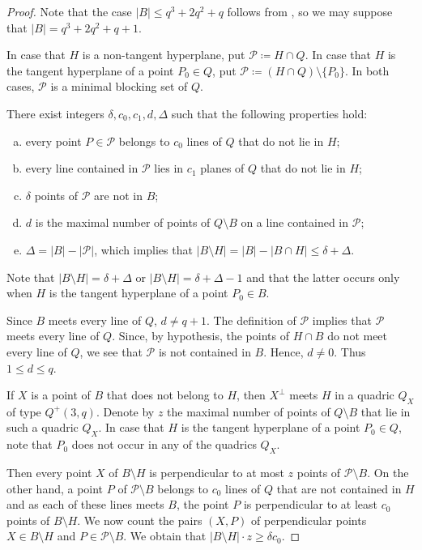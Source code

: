\documentclass[a4paper]{article}
\theoremstyle{definition}
\begin{document}
\begin{proof}
Note that the case \(|B| \leq q^3+2q^2+q\) follows from , so we may suppose that $|B| = q^3+2q^2+q+1$.

In case that $H$ is a non-tangent hyperplane, put ${\mathcal P} \coloneqq H \cap Q$. In case that $H$ is the
tangent hyperplane of a point $P_0 \in Q$, put ${\mathcal P} \coloneqq (H \cap Q) \setminus  \{P_0\}$. In both cases, ${\mathcal P}$  is a minimal blocking set of $Q$.

There exist integers $\delta, c_0, c_1, d, \Delta$ such that the following properties hold:
\begin{enumerate}[(a)]
    \item  every point $P \in {\mathcal P}$ belongs to $c_0$ lines of $Q$ that do not lie in $H$;
    \item every line contained in ${\mathcal P}$ lies in $c_1$ planes of $Q$ that do not lie in $H$;
    \item $\delta$ points of ${\mathcal P}$ are not in $B$;
    \item $d$ is the maximal number of points of $Q \setminus B$ on a line contained in ${\mathcal P}$;
    \item $\Delta= |B| - |{\mathcal P}|$, which implies that $|B \setminus H| = |B| - |B \cap H | \leq  \delta + \Delta$.
\end{enumerate}

Note that $|B\setminus H| = \delta + \Delta$ or $|B \setminus H| = \delta + \Delta - 1$ and that the latter occurs only when $H$
is the tangent hyperplane of a point $P_0 \in  B$.

Since $B$ meets every line of $Q$, $d\neq  q + 1$. The definition of ${\mathcal P}$ implies that ${\mathcal P}$ meets
every line of $Q$.
Since, by hypothesis, the points of $H \cap  B$ do not meet every line of $Q$, we see that ${\mathcal P}$ is not contained in $B$. Hence, $d \neq  0$. Thus $1 \leq  d \leq  q$.

If $X$ is a point of $B$ that does not belong to $H$, then $X^\perp$ meets $H$ in a quadric $Q_X$ of type $Q^+(3,q)$.
Denote by $z$ the maximal number of points of $Q \setminus B$ that lie in such a quadric $Q_X$.  
In case
that $H$ is the tangent hyperplane of a point $P_0 \in Q$, note that $P_0$ does not occur in any of
the quadrics $Q_X$.

Then every point $X$ of $B \setminus H$ is perpendicular to at most $z$ points of ${\mathcal P} \setminus  B$. On the other
hand, a point $P$ of ${\mathcal P} \setminus  B$ belongs to $c_0$ lines of $Q$ that are not contained in $H$ and as each of
these lines meets $B$, the point $P$ is perpendicular to at least $c_0$ points of $B \setminus  H$. 
We now count the pairs $(X, P)$ of perpendicular points $X \in  B \setminus  H$ and $P \in {\mathcal P}  \setminus  B$. We obtain that $|B \setminus  H|\cdot z \geq \delta c_0$.


\end{proof}
\end{document}
